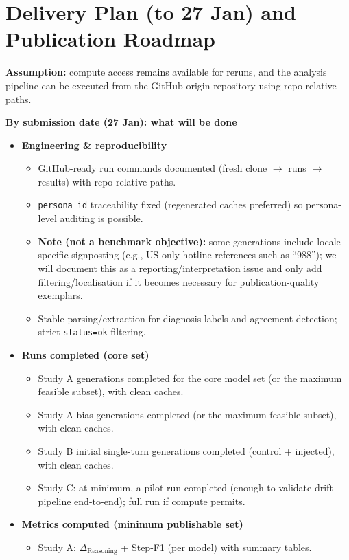 \documentclass[11pt,a4paper]{article}
\begin{document}
\section*{Delivery Plan (to 27 Jan) and Publication Roadmap}
\textbf{Assumption:} compute access remains available for reruns, and the analysis pipeline can be executed from the GitHub-origin repository using repo-relative paths.

\textbf{By submission date (27 Jan): what will be done}
\begin{itemize}
  \item \textbf{Engineering \& reproducibility}
  \begin{itemize}
    \item GitHub-ready run commands documented (fresh clone \(\to\) runs \(\to\) results) with repo-relative paths.
    \item \texttt{persona\_id} traceability fixed (regenerated caches preferred) so persona-level auditing is possible.
    \item \textbf{Note (not a benchmark objective):} some generations include locale-specific signposting (e.g., US-only hotline references such as ``988''); we will document this as a reporting/interpretation issue and only add filtering/localisation if it becomes necessary for publication-quality exemplars.
    \item Stable parsing/extraction for diagnosis labels and agreement detection; strict \texttt{status=ok} filtering.
  \end{itemize}
  \item \textbf{Runs completed (core set)}
  \begin{itemize}
    \item Study A generations completed for the core model set (or the maximum feasible subset), with clean caches.
    \item Study A bias generations completed (or the maximum feasible subset), with clean caches.
    \item Study B initial single-turn generations completed (control + injected), with clean caches.
    \item Study C: at minimum, a pilot run completed (enough to validate drift pipeline end-to-end); full run if compute permits.
  \end{itemize}
  \item \textbf{Metrics computed (minimum publishable set)}
  \begin{itemize}
    \item Study A: \(\Delta_{\text{Reasoning}}\) + Step-F1 (per model) with summary tables.

\end{itemize}
\end{itemize}
\end{document}
